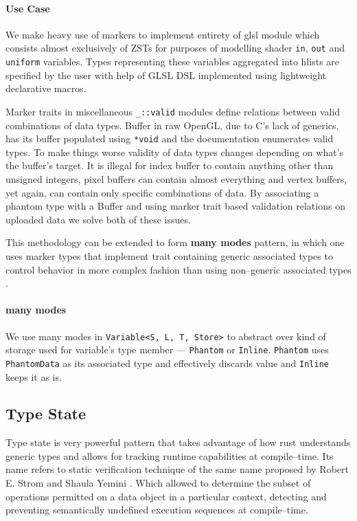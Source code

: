 \paragraph{Use Case}

We make heavy use of markers to implement entirety of glsl module which consists almost exclusively of ZSTs for purposes of modelling shader \texttt{in}, \texttt{out} and \texttt{uniform} variables.
Types representing these variables aggregated into hlists are specified by the user with help of GLSL DSL implemented using lightweight declarative macros.

Marker traits in miscellaneous \texttt{\_::valid} modules define relations between valid combinations of data types. Buffer in raw OpenGL, 
due to C's lack of generics, has its buffer populated using \texttt{*void} and the documentation enumerates valid types. 
To make things worse validity of data types changes depending on what's the buffer's target.
It is illegal for index buffer to contain anything other than unsigned integers, pixel buffers can contain almost everything and vertex buffers, 
yet again, can contain only specific combinations of data.
By associating a phantom type with a Buffer and using marker trait based validation relations on uploaded data we solve both of these issues.

This methodology can be extended to form \textbf{many modes} pattern, in which one uses marker types that implement trait 
containing generic associated types to control behavior in more complex fashion than using non--generic associated types \cite{nikobloggats}.

\paragraph{many modes}

We use many modes in \texttt{Variable<S, L, T, Store>} to abstract over kind of storage used for variable's type member --- \texttt{Phantom} or \texttt{Inline}.
\texttt{Phantom} uses \texttt{PhantomData} as its associated type and effectively discards value and \texttt{Inline} keeps it as is.

\subsection{Type State}

Type state is very powerful pattern that takes advantage of how rust understands generic types and allows for tracking runtime capabilities at compile--time.
Its name refers to static verification technique of the same name proposed by Robert E. Strom and Shaula Yemini \cite{typestate}. 
Which allowed to determine the subset of operations permitted on a data object in a particular context,
detecting and preventing semantically undefined execution sequences at compile--time.

